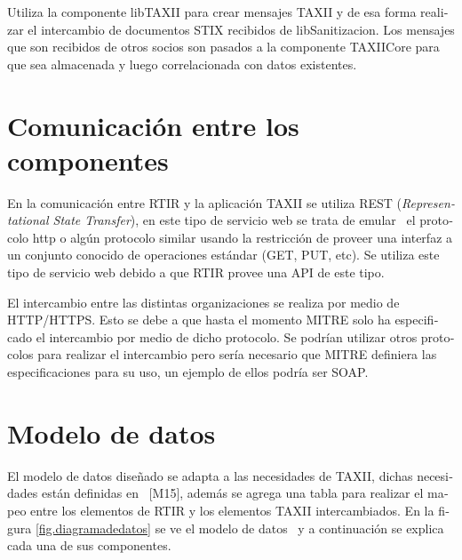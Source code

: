 	\bigskip
	
	\foreignlanguage{spanish}{Utiliza la componente libTAXII para crear mensajes TAXII y de esa forma realizar el
		intercambio de documentos STIX recibidos de libSanitizacion. Los mensajes que son recibidos de otros socios son pasados
		a la componente TAXIICore para que sea almacenada y luego correlacionada con datos existentes. }
	
	
	\bigskip
	
	\section[Comunicación entre los componentes]{\foreignlanguage{spanish}{Comunicación entre los componentes}}
	
	\bigskip
	
	\foreignlanguage{spanish}{En la comunicación entre RTIR y la aplicación TAXII se utiliza REST (\textit{Representational State
		Transfer}), en este tipo de servicio web se trata de emular \ el protocolo http o algún protocolo similar usando la
		restricción de proveer una interfaz a un conjunto conocido de operaciones estándar (GET, PUT, etc). Se utiliza este
		tipo de servicio web debido a que RTIR provee una API de este tipo. }
	
	
	\bigskip
	
	\foreignlanguage{spanish}{El intercambio entre las distintas organizaciones se realiza por medio de HTTP/HTTPS. Esto se
		debe a que hasta el momento MITRE solo ha especificado el intercambio por medio de dicho protocolo. Se podrían utilizar
		otros protocolos para realizar el intercambio pero sería necesario que MITRE definiera las especificaciones para su
		uso, un ejemplo de ellos podría ser SOAP.}
	
	
	\bigskip
	
	\section[Modelo de datos]{\foreignlanguage{spanish}{Modelo de datos}}
	\foreignlanguage{spanish}{El modelo de datos diseñado se adapta a las necesidades de TAXII, dichas necesidades están
		definidas en \ [M15], además se agrega una tabla para realizar el mapeo entre los elementos de RTIR y los elementos
		TAXII intercambiados. En la figura \ref{fig.diagramadedatos} se ve el modelo de datos \ y a continuación se explica cada una de sus
		componentes.}
	
